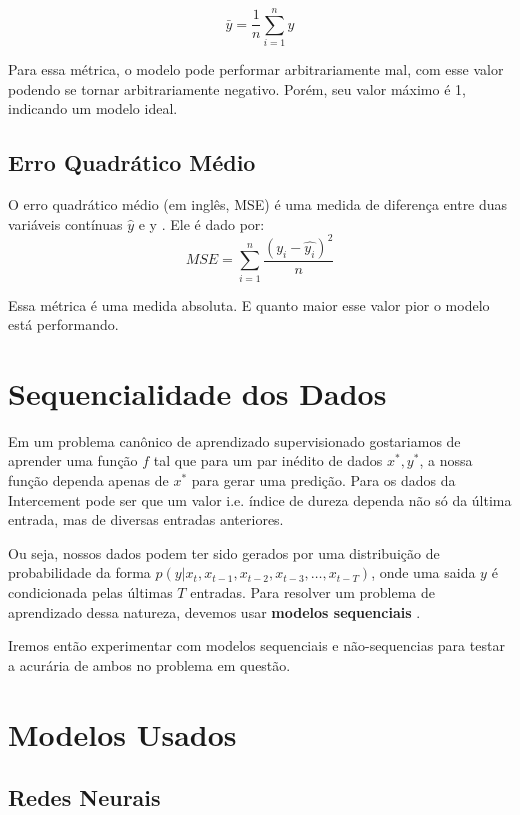 \[ \bar{y} = \frac{1}{n} \sum^n_{i=1} y\]

Para essa métrica, o modelo pode performar arbitrariamente mal, com esse valor
podendo se tornar arbitrariamente negativo. Porém, seu valor máximo é 1,
indicando um modelo ideal.\\


\subsection{Erro Quadrático Médio}
\label{sec:MSE}
O erro quadrático médio (em inglês, MSE) é uma medida de diferença entre duas variáveis contínuas
$\hat{y}$ e y \citep{cohen}. Ele é dado por: \\

\[MSE = \sum^n_{i=1}\frac{(y_i - \hat{y_i})^2}{n}\]

Essa métrica é uma medida absoluta. E quanto maior esse valor pior o modelo está performando.




\section{Sequencialidade dos Dados}

Em um problema canônico de aprendizado supervisionado gostariamos de aprender
uma função $f$ tal que para um par inédito de dados $x^*,y^*$, a nossa função
dependa apenas de $x^*$ para gerar uma predição. Para os dados da Intercement pode ser que um valor i.e. índice de dureza dependa não só da última entrada, mas de diversas entradas anteriores. 

Ou seja, nossos dados podem ter sido gerados por uma distribuição de
probabilidade da forma $p(y | x_{t} ,x_{t -1},x_{t -2},x_{t-3} , \dots,
x_{t-T})$, onde uma saida $y$ é condicionada pelas últimas $T$ entradas. Para
resolver um problema de aprendizado dessa natureza, devemos usar \textbf{modelos
  sequenciais} \citep{dlbook}. 

Iremos então experimentar com modelos sequenciais e não-sequencias para testar a acurária de ambos no problema em questão.


\section{Modelos Usados} 

\subsection{Redes Neurais}


